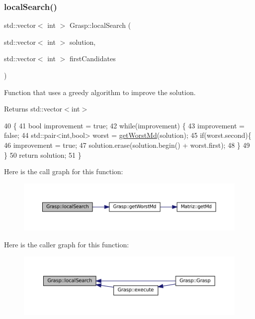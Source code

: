 \subsubsection{\texorpdfstring{local\+Search()}{localSearch()}}
{\footnotesize\ttfamily std\+::vector$<$ int $>$ Grasp\+::local\+Search (\begin{DoxyParamCaption}\item[{std\+::vector$<$ int $>$}]{solution,  }\item[{std\+::vector$<$ int $>$}]{first\+Candidates }\end{DoxyParamCaption})}



Function that uses a greedy algorithm to improve the solution. 

\begin{DoxyReturn}{Returns}
std\+::vector$<$int$>$ 
\end{DoxyReturn}

\begin{DoxyCode}
40                                                                                          \{
41   \textcolor{keywordtype}{bool} improvement = \textcolor{keyword}{true};
42   \textcolor{keywordflow}{while}(improvement) \{
43     improvement = \textcolor{keyword}{false};
44     std::pair<int,bool> worst = \hyperlink{classGrasp_a858a5aee4066bf5ef7946e8ea3e10bcf}{getWorstMd}(solution);
45     \textcolor{keywordflow}{if}(worst.second)\{
46       improvement = \textcolor{keyword}{true};
47       solution.erase(solution.begin() + worst.first);
48     \}
49   \}
50   \textcolor{keywordflow}{return} solution;
51 \}
\end{DoxyCode}
Here is the call graph for this function\+:
\nopagebreak
\begin{figure}[H]
\begin{center}
\leavevmode
\includegraphics[width=350pt]{classGrasp_a7c5bebb4a0dea342928f66fb73a56559_cgraph}
\end{center}
\end{figure}
Here is the caller graph for this function\+:
\nopagebreak
\begin{figure}[H]
\begin{center}
\leavevmode
\includegraphics[width=350pt]{classGrasp_a7c5bebb4a0dea342928f66fb73a56559_icgraph}
\end{center}
\end{figure}
\mbox{\label{classGrasp_ac63d4a1892472663549c77686edfed74}} 
